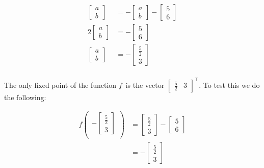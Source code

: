 \documentclass{article}
\begin{document}
\begin{align*}
    \begin{bmatrix}a\\b\end{bmatrix} &=
        -\begin{bmatrix}a\\b\end{bmatrix}
        - \begin{bmatrix} 5 \\ 6\end{bmatrix} \\
    2\begin{bmatrix}a\\b\end{bmatrix} &=
        - \begin{bmatrix} 5 \\ 6\end{bmatrix} \\
    \begin{bmatrix}a\\b\end{bmatrix} &=
        - \begin{bmatrix} \frac 52 \\ 3\end{bmatrix} \\
\end{align*}

The only fixed point of the function $f$ is the vector $\begin{bmatrix} \frac 52 & 3 \end{bmatrix}^\top$. To test this we do the following:

\begin{align}
    f \begin{pmatrix}
        - \begin{bmatrix} \frac 52 \\ 3\end{bmatrix} \\
    \end{pmatrix} &= 
    \begin{bmatrix} \frac 52 \\ 3\end{bmatrix} - \begin{bmatrix} 5 \\ 6\end{bmatrix} \\
        &= -\begin{bmatrix} \frac 52 \\ 3\end{bmatrix}
\end{align}
\end{document}
